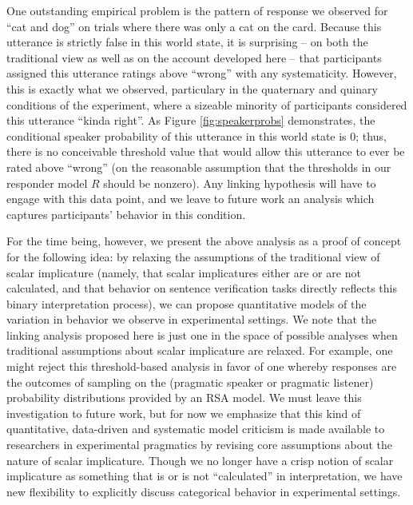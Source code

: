 \documentclass[man]{apa6}
\theoremstyle{definition}
\theoremstyle{definition}
\theoremstyle{definition}
\theoremstyle{remark}
\begin{document}
One outstanding empirical problem is the pattern of response we observed
for \enquote{cat and dog} on trials where there was only a cat on the
card. Because this utterance is strictly false in this world state, it
is surprising -- on both the traditional view as well as on the account
developed here -- that participants assigned this utterance ratings
above \enquote{wrong} with any systematicity. However, this is exactly
what we observed, particulary in the quaternary and quinary conditions
of the experiment, where a sizeable minority of participants considered
this utterance \enquote{kinda right}. As Figure \ref{fig:speakerprobs}
demonstrates, the conditional speaker probability of this utterance in
this world state is 0; thus, there is no conceivable threshold value
that would allow this utterance to ever be rated above \enquote{wrong}
(on the reasonable assumption that the thresholds in our responder model
\(R\) should be nonzero). Any linking hypothesis will have to engage
with this data point, and we leave to future work an analysis which
captures participants' behavior in this condition.

For the time being, however, we present the above analysis as a proof of
concept for the following idea: by relaxing the assumptions of the
traditional view of scalar implicature (namely, that scalar implicatures
either are or are not calculated, and that behavior on sentence
verification tasks directly reflects this binary interpretation
process), we can propose quantitative models of the variation in
behavior we observe in experimental settings. We note that the linking
analysis proposed here is just one in the space of possible analyses
when traditional assumptions about scalar implicature are relaxed. For
example, one might reject this threshold-based analysis in favor of one
whereby responses are the outcomes of sampling on the (pragmatic speaker
or pragmatic listener) probability distributions provided by an RSA
model. We must leave this investigation to future work, but for now we
emphasize that this kind of quantitative, data-driven and systematic
model criticism is made available to researchers in experimental
pragmatics by revising core assumptions about the nature of scalar
implicature. Though we no longer have a crisp notion of scalar
implicature as something that is or is not \enquote{calculated} in
interpretation, we have new flexibility to explicitly discuss
categorical behavior in experimental settings.
\end{document}
